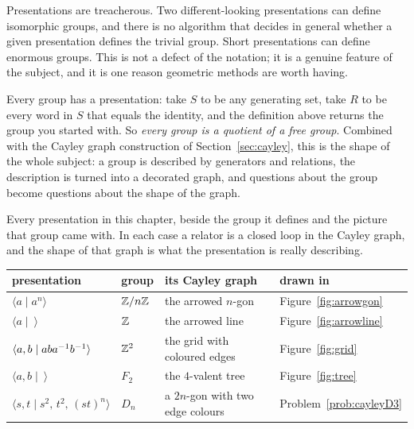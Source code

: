 
\begin{pitfall}
Presentations are treacherous. Two different-looking presentations can define isomorphic groups, and
there is no algorithm that decides in general whether a given presentation defines the trivial
group. Short presentations can define enormous groups. This is not a defect of the notation; it is a
genuine feature of the subject, and it is one reason geometric methods are worth having.
\end{pitfall}

\begin{bigpic}
Every group has a presentation: take $S$ to be any generating set, take $R$ to be every word in $S$
that equals the identity, and the definition above returns the group you started with. So
\emph{every group is a quotient of a free group}. Combined with the Cayley graph construction of
Section~\ref{sec:cayley}, this is the shape of the whole subject: a group is described by
generators and relations, the description is turned into a decorated graph, and questions about the
group become questions about the shape of the graph.
\end{bigpic}

Every presentation in this chapter, beside the group it defines and the picture that group came
with. In each case a relator is a closed loop in the Cayley graph, and the shape of that graph is
what the presentation is really describing.

\begin{center}
\small
\begin{tabular}{@{}llll@{}}
\toprule
presentation & group & its Cayley graph & drawn in\\
\midrule
$\langle a \mid a^n\rangle$ & $\mathbb{Z}/n\mathbb{Z}$ & the arrowed $n$-gon & Figure~\ref{fig:arrowgon}\\
$\langle a \mid \ \rangle$ & $\mathbb{Z}$ & the arrowed line & Figure~\ref{fig:arrowline}\\
$\langle a,b \mid aba^{-1} b^{-1}\rangle$ & $\mathbb{Z}^2$ & the grid with coloured edges & Figure~\ref{fig:grid}\\
$\langle a,b \mid \ \rangle$ & $F_2$ & the $4$-valent tree & Figure~\ref{fig:tree}\\
$\langle s,t \mid s^2,\,t^2,\,(st)^n\rangle$ & $D_n$ & a $2n$-gon with two edge colours & Problem~\ref{prob:cayleyD3}\\
\bottomrule
\end{tabular}
\end{center}

